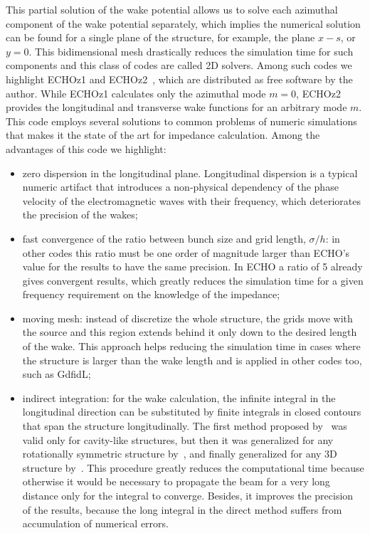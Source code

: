     This partial solution of the wake potential allows us to solve each azimuthal component of the wake potential separately, which implies the numerical solution can be found for a single plane of the structure, for example, the plane $x-s$, or $y=0$. This bidimensional mesh drastically reduces the simulation time for such components and this class of codes are called 2D solvers. Among such codes we highlight ECHOz1 and ECHOz2~\cite{Zagorodnov2003, Zagorodnov2005, Zagorodnov2006a}, which are distributed as free software by the author. While ECHOz1 calculates only the azimuthal mode $m=0$, ECHOz2 provides the longitudinal and transverse wake functions for an arbitrary mode $m$.  This code employs several solutions to common problems of numeric simulations that makes it the state of the art for impedance calculation. Among the advantages of this code we highlight:
    \begin{itemize}
	    \item zero dispersion in the longitudinal plane. Longitudinal dispersion is a typical numeric artifact that introduces a non-physical dependency of the phase velocity of the electromagnetic waves with their frequency, which deteriorates the precision of the wakes;
	    \item fast convergence of the ratio between bunch size and grid length, $\sigma/h$: in other codes this ratio must be one order of magnitude larger than ECHO's value for the results to have the same precision. In ECHO a ratio of \SI{5}{} already gives convergent results, which greatly reduces the simulation time for a given frequency requirement on the knowledge of the impedance;
	    \item moving mesh: instead of discretize the whole structure, the grids move with the source and this region extends behind it only down to the desired length of the wake. This approach helps reducing the simulation time in cases where the structure is larger than the wake length and is applied in other codes too, such as GdfidL;
	    \item indirect integration: for the wake calculation, the infinite integral in the longitudinal direction can be substituted by finite integrals in closed contours that span the structure longitudinally. The first method proposed by~ was valid only for cavity-like structures, but then it was generalized for any rotationally symmetric structure by~, and finally generalized for any 3D structure by~. This procedure greatly reduces the computational time because otherwise it would be necessary to propagate the beam for a very long distance only for the integral to converge. Besides, it improves the precision of the results, because the long integral in the direct method suffers from accumulation of numerical errors.
    \end{itemize}

